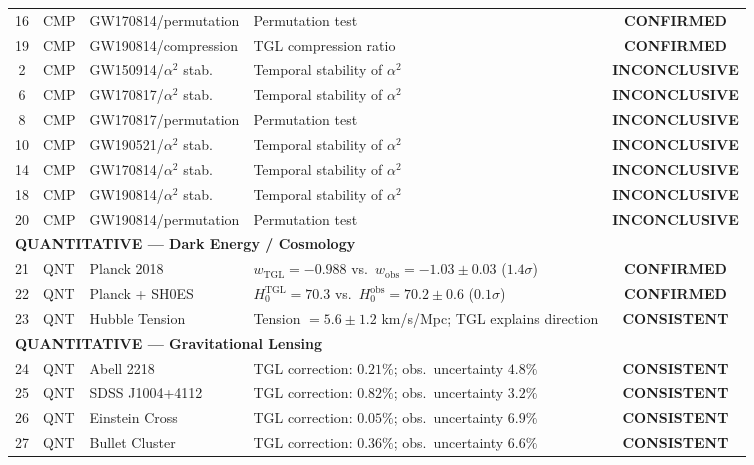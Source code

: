 \documentclass[12pt,a4paper,twoside]{article}
\newcommand{\alphaii}{\alpha^{2}}
\newcommand{\confirmed}{\textcolor{tglgreen}{\textbf{CONFIRMED}}}
\newcommand{\consistent}{\textcolor{tglblue}{\textbf{CONSISTENT}}}
\newcommand{\inconclusive}{\textcolor{tglgray}{\textbf{INCONCLUSIVE}}}
\begin{document}
\begin{small}
\begin{longtable}{clp{3.5cm}p{4.5cm}c}
16 & CMP & GW170814/permutation & Permutation test                     & \confirmed \\
19 & CMP & GW190814/compression  & TGL compression ratio                      & \confirmed \\
2  & CMP & GW150914/$\alphaii$ stab. & Temporal stability of $\alphaii$           & \inconclusive \\
6  & CMP & GW170817/$\alphaii$ stab. & Temporal stability of $\alphaii$           & \inconclusive \\
8  & CMP & GW170817/permutation & Permutation test                     & \inconclusive \\
10 & CMP & GW190521/$\alphaii$ stab. & Temporal stability of $\alphaii$           & \inconclusive \\
14 & CMP & GW170814/$\alphaii$ stab. & Temporal stability of $\alphaii$           & \inconclusive \\
18 & CMP & GW190814/$\alphaii$ stab. & Temporal stability of $\alphaii$           & \inconclusive \\
20 & CMP & GW190814/permutation & Permutation test                     & \inconclusive \\
%
\midrule
\multicolumn{5}{l}{\textbf{QUANTITATIVE --- Dark Energy / Cosmology}} \\
\midrule
21 & QNT & Planck 2018           & $w_{\text{TGL}} = -0.988$ vs.\ $w_{\text{obs}} = -1.03 \pm 0.03$ ($1.4\sigma$)  & \confirmed \\
22 & QNT & Planck + SH0ES        & $H_0^{\text{TGL}} = 70.3$ vs.\ $H_0^{\text{obs}} = 70.2 \pm 0.6$ ($0.1\sigma$) & \confirmed \\
23 & QNT & Hubble Tension     & Tension $= 5.6 \pm 1.2$ km/s/Mpc; TGL explains direction                        & \consistent \\
%
\midrule
\multicolumn{5}{l}{\textbf{QUANTITATIVE --- Gravitational Lensing}} \\
\midrule
24 & QNT & Abell 2218            & TGL correction: $0.21\%$; obs.\ uncertainty $4.8\%$  & \consistent \\
25 & QNT & SDSS J1004+4112       & TGL correction: $0.82\%$; obs.\ uncertainty $3.2\%$  & \consistent \\
26 & QNT & Einstein Cross      & TGL correction: $0.05\%$; obs.\ uncertainty $6.9\%$  & \consistent \\
27 & QNT & Bullet Cluster          & TGL correction: $0.36\%$; obs.\ uncertainty $6.6\%$  & \consistent \\

\end{longtable}
\end{small}
\end{document}
